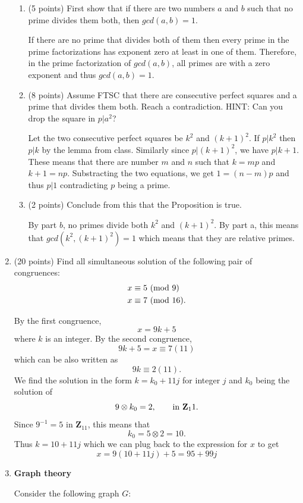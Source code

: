 \documentclass[12pt]{article}
\begin{document}
\begin{enumerate}
\begin{enumerate}
\item (5 points) First show that if there are two numbers $a$ and $b$ such that no prime divides them both, then $gcd(a,b)=1$.

If there are no prime that divides both of them then every prime in the prime factorizations has exponent zero at least in one of them. Therefore, in the prime factorization of $gcd(a,b)$, all primes are with a zero exponent and thus $gcd(a,b)=1$.
\item (8 points) Assume FTSC that there are consecutive perfect squares and a prime that divides them both. Reach a contradiction.
HINT: Can you drop the square in $p|a^2$?

Let the two consecutive perfect squares be $k^2$ and $(k+1)^2$. If $p|k^2$ then $p|k$ by the lemma from class. Similarly since $p|(k+1)^2$, we have $p|k+1$. These means that there are number $m$ and $n$ such that $k=mp$ and $k+1=np$. Substracting the two equations, we get $1=(n-m)p$ and thus $p|1$ contradicting $p$ being a prime.

\item (2 points) Conclude from this that the Proposition is true.

By part $b$, no primes divide both $k^2$ and $(k+1)^2$. By part a, this means that $gcd(k^2,(k+1)^2)=1$ which means that they are relative primes.
\end{enumerate}

\newpage
\item(20 points) Find all simultaneous solution of the following pair of congruences:
\begin{align*}
x&\equiv 5~({\rm mod}~9)\\
x&\equiv 7~({\rm mod}~16).
\end{align*}

By the first congruence,
\[
x = 9k +5
\]
where $k$ is an integer. By the second congruence,
\[
9k + 5 = x\equiv 7 (11)
\]
which can be also written as
\[
9k\equiv 2 (11).
\]
We find the solution in the form $k=k_0+11j$ for integer $j$ and $k_0$ being the solution of
\[
9\otimes k_0 = 2,\qquad {\rm in~\mathbf{Z}_11}.
\]
Since $9^{-1}=5$ in $\mathbf{Z}_11$, this means that
\[
k_0 = 5\otimes 2 = 10.
\]
Thus $k = 10 + 11j$ which we can plug back to the expression for $x$ to get
\[
x = 9(10+11j)+5=95+99j
\]

\newpage
\item \textbf{Graph theory}

Consider the following graph $G$:


\end{enumerate}
\end{document}
